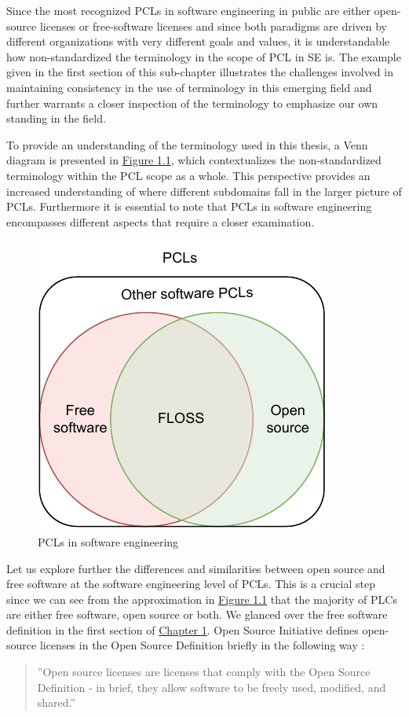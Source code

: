 Since the most recognized PCLs in software engineering in public are either open-source licenses or free-software licenses and since both paradigms are driven by different organizations with very different goals and values, it is understandable how non-standardized the terminology in the scope of PCL in SE is. The example given in the first section of this sub-chapter illustrates the challenges involved in maintaining consistency in the use of terminology in this emerging field and further warrants a closer inspection of the terminology to emphasize our own standing in the field.

To provide an understanding of the terminology used in this thesis, a Venn diagram is presented in \hyperref[fig:terms]{Figure 1.1}, which contextualizes the non-standardized terminology within the PCL scope as a whole. This perspective provides an increased understanding of where different subdomains fall in the larger picture of PCLs. Furthermore it is essential to note that PCLs in software engineering encompasses different aspects that require a closer examination.

\begin{figure}[t]
	\centering
	\includegraphics[scale=1.5]{figures/terms-diagram.pdf}
	\caption{PCLs in software engineering}
	\label{fig:terms}
\end{figure}

Let us explore further the differences and similarities between open source and free software at the software engineering level of PCLs. This is a crucial step since we can see from the approximation in \hyperref[fig:terms]{Figure 1.1} that the majority of PLCs are either free software, open source or both. We glanced over the free software definition in the first section of \hyperref[intro]{Chapter 1}. Open Source Initiative defines open-source licenses in the Open Source Definition briefly in the following way \citep{osi:licenselist}:
\begin{quote}
	''Open source licenses are licenses that comply with the Open Source Definition - in brief, they allow software to be freely used, modified, and shared.''
\end{quote}

